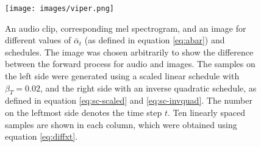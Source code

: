 \documentclass{report}
\begin{document}
\begin{figure}[H]
    \centering
    \texttt{[image: images/viper.png]}
    \caption{\onehalfspacing An audio clip, corresponding mel spectrogram, and an image for different values of $\bar{\alpha}_t$ (as defined in equation \ref{eq:abar}) and schedules. The image was chosen arbitrarily to show the difference between the forward process for audio and images. The samples on the left side were generated using a scaled linear schedule with $\beta_T=0.02$, and the right side with an inverse quadratic schedule, as defined in equation \ref{eq:sc-scaled} and \ref{eq:sc-invquad}. The number on the leftmost side denotes the time step $t$. Ten linearly spaced samples are shown in each column, which were obtained using equation \ref{eq:diffxt}.}
    \label{fig:viper}
\end{figure}
\end{document}
